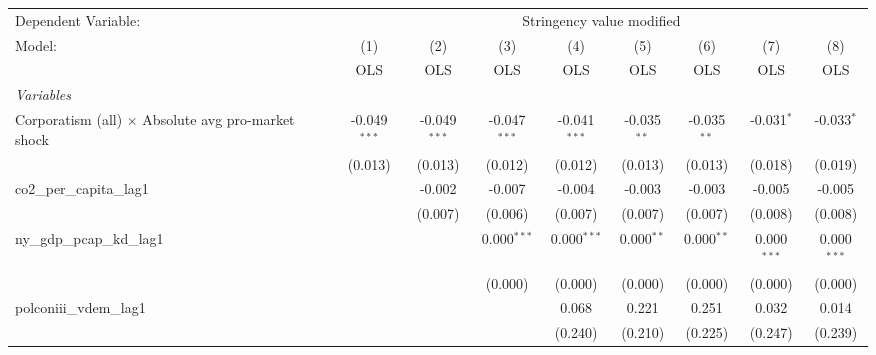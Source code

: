 
\begingroup
\centering
\begin{tabular}{lcccccccc}
   \toprule
   Dependent Variable: & \multicolumn{8}{c}{Stringency value modified}\\
   Model:                                                    & (1)            & (2)            & (3)            & (4)            & (5)           & (6)           & (7)           & (8)\\  
                                                             &  OLS           & OLS            & OLS            & OLS            & OLS           & OLS           & OLS           & OLS\\  
   \midrule
   \emph{Variables}\\
   Corporatism (all) $\times$ Absolute avg pro-market shock  & -0.049$^{***}$ & -0.049$^{***}$ & -0.047$^{***}$ & -0.041$^{***}$ & -0.035$^{**}$ & -0.035$^{**}$ & -0.031$^{*}$  & -0.033$^{*}$\\   
                                                             & (0.013)        & (0.013)        & (0.012)        & (0.012)        & (0.013)       & (0.013)       & (0.018)       & (0.019)\\   
   co2\_per\_capita\_lag1                                    &                & -0.002         & -0.007         & -0.004         & -0.003        & -0.003        & -0.005        & -0.005\\   
                                                             &                & (0.007)        & (0.006)        & (0.007)        & (0.007)       & (0.007)       & (0.008)       & (0.008)\\   
   ny\_gdp\_pcap\_kd\_lag1                                   &                &                & 0.000$^{***}$  & 0.000$^{***}$  & 0.000$^{**}$  & 0.000$^{**}$  & 0.000$^{***}$ & 0.000$^{***}$\\   
                                                             &                &                & (0.000)        & (0.000)        & (0.000)       & (0.000)       & (0.000)       & (0.000)\\   
   polconiii\_vdem\_lag1                                     &                &                &                & 0.068          & 0.221         & 0.251         & 0.032         & 0.014\\   
                                                             &                &                &                & (0.240)        & (0.210)       & (0.225)       & (0.247)       & (0.239)\\   

\end{tabular}
